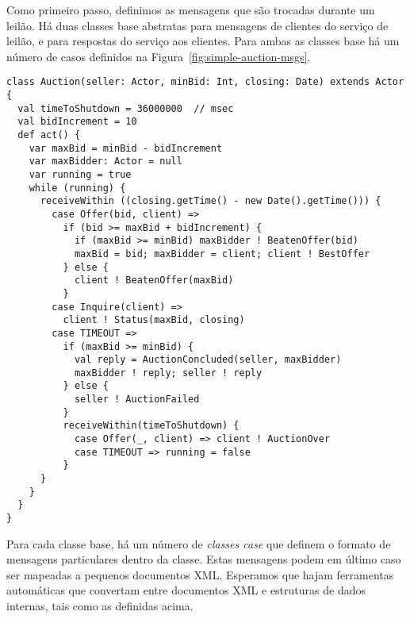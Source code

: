 Como primeiro passo, definimos as mensagens que s\~{a}o trocadas durante um
leil\~{a}o. H\'{a} duas classes base abstratas  para mensagens 
de clientes do servi\c{c}o de leil\~{a}o, e  para respostas 
do servi\c{c}o aos clientes. Para ambas as classes base h\'{a} um n\'{u}mero de casos 
definidos na Figura~\ref{fig:simple-auction-msgs}.

\begin{lstlisting}[style=floating,label=fig:simple-auction,caption=Implementation of an Auction Service]
class Auction(seller: Actor, minBid: Int, closing: Date) extends Actor {
  val timeToShutdown = 36000000  // msec
  val bidIncrement = 10
  def act() {
    var maxBid = minBid - bidIncrement
    var maxBidder: Actor = null
    var running = true
    while (running) {
      receiveWithin ((closing.getTime() - new Date().getTime())) {
        case Offer(bid, client) =>
          if (bid >= maxBid + bidIncrement) { 
            if (maxBid >= minBid) maxBidder ! BeatenOffer(bid)
            maxBid = bid; maxBidder = client; client ! BestOffer
          } else {
            client ! BeatenOffer(maxBid)
          }
        case Inquire(client) =>
          client ! Status(maxBid, closing)
        case TIMEOUT =>
          if (maxBid >= minBid) {
            val reply = AuctionConcluded(seller, maxBidder)
            maxBidder ! reply; seller ! reply
          } else {
            seller ! AuctionFailed
          }
          receiveWithin(timeToShutdown) {
            case Offer(_, client) => client ! AuctionOver
            case TIMEOUT => running = false
          }
      }
    }
  } 
}
\end{lstlisting}

Para cada classe base, h\'{a} um n\'{u}mero de {\em classes case} que definem
o formato de mensagens particulares dentro da classe. Estas mensagens
podem em \'{u}ltimo caso ser mapeadas a pequenos documentos XML. Esperamos
que hajam ferramentas autom\'{a}ticas que convertam entre documentos XML e 
estruturas de dados internas, tais como as definidas acima.
%

